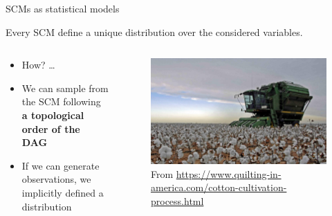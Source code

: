 \documentclass{beamer}
\begin{document}
\begin{frame}{SCMs as statistical models}
\begin{block}{}
      Every SCM define a unique distribution over the considered variables.  
    \end{block}
  \begin{columns}
\begin{column}{0.5\textwidth}
    \begin{itemize}
      \item<2-> How? \ldots 
      \item<3-> We can sample from the SCM following \textbf{a topological order of the DAG} 
      \item<4-> If we can generate observations, we implicitly defined a distribution 
    \end{itemize}
\end{column}
\begin{column}{0.5\textwidth}
  \begin{figure}
  \includegraphics[width=\textwidth]{cotton-picker}
    \caption{From \url{https://www.quilting-in-america.com/cotton-cultivation-process.html}}
  \end{figure}
\end{column}
  \end{columns}
\end{frame}
\end{document}

